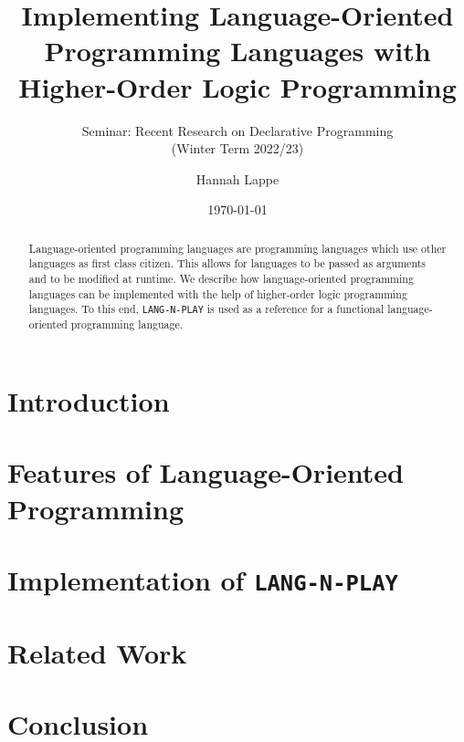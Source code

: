 \documentclass[a4paper, 12pt]{scrartcl}
\title{Implementing Language-Oriented Programming Languages with Higher-Order Logic Programming}
\subtitle{Seminar: Recent Research on Declarative Programming\\
  (Winter Term 2022/23)}
\author{Hannah Lappe}
\date{\today}
\begin{document}
\maketitle

\begin{abstract}
  Language-oriented programming languages are programming languages which use other languages as first class citizen. This allows for languages to be passed as arguments and to be modified at runtime. We describe how language-oriented programming languages can be implemented with the help of higher-order logic programming languages. To this end, \texttt{LANG-N-PLAY} is used as a reference for a functional language-oriented programming language. 
\end{abstract}

\section{Introduction}

\section{Features of Language-Oriented Programming}

\section{Implementation of \texttt{LANG-N-PLAY}}

\section {Related Work}

\section{Conclusion}
\cite{*}




\end{document}
